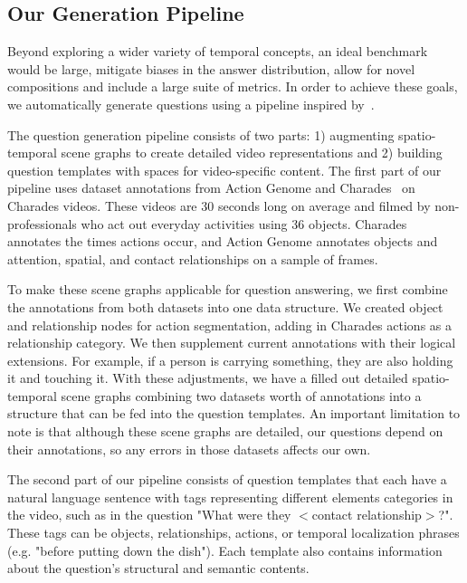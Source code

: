 \documentclass[10pt,twocolumn,letterpaper]{article}
\newcommand{\mgm}[1]{{\color{cyan}{mgm: #1}}}
\begin{document}
\subsection{Our Generation Pipeline}
Beyond exploring a wider variety of temporal concepts, an ideal benchmark would be large, mitigate biases in the answer distribution, allow for novel compositions and include a large suite of metrics. In order to achieve these goals, we automatically generate questions using a pipeline inspired by~\cite{hudson2019gqa}.

The question generation pipeline consists of two parts: 1) augmenting spatio-temporal scene graphs to create detailed video representations and 2) building question templates with spaces for video-specific content. The first part of our pipeline uses dataset annotations from Action Genome and Charades~\cite{ji2020action,sigurdsson2016hollywood} on Charades videos. These videos are 30 seconds long on average and filmed by non-professionals \mgm{MTurk workers} who act out everyday activities using 36 objects. Charades annotates the times actions occur, and Action Genome annotates objects and attention, spatial, and contact relationships on a sample of frames. 

To make these scene graphs applicable for question answering, we first combine the annotations from both datasets into one data structure. We created object and relationship nodes for action segmentation, adding in Charades actions as a relationship category. We then supplement current annotations with their logical extensions. For example, if a person is carrying something, they are also holding it and touching it. With these adjustments, we have a filled out detailed spatio-temporal scene graphs combining two datasets worth of annotations into a structure that can be fed into the question templates. An important limitation to note is that although these scene graphs are detailed, our questions depend on their annotations, so any errors in those datasets affects our own. \mgm{add in more detail about action priors and combining multiply annotated objects and other things like this}
    
The second part of our pipeline consists of question templates that each have a natural language sentence with tags representing different elements categories in the video, such as in the question "What were they $<$contact relationship$>$?". These tags can be objects, relationships, actions, or temporal localization phrases (e.g. "before putting down the dish"). Each template also contains information about the question's structural and semantic contents. 
\end{document}
